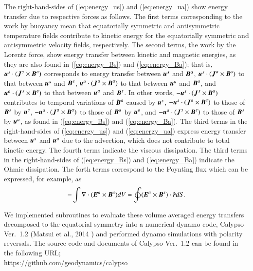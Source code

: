 %
The right-hand-sides of (\ref{eq:energy_us}) and (\ref{eq:energy_ua}) show energy transfer due to respective forces as follows.
The first terms corresponding to the work by buoyancy mean that equatorially symmetric and antisymmetric temperature fields contribute to kinetic energy for the equatorially symmetric and antisymmetric velocity fields, respectively.
The second terms, the work by the Lorentz force, show energy transfer between kinetic and magnetic energies, as they are also found in (\ref{eq:energy_Bs}) and (\ref{eq:energy_Ba}); that is, $\mbox{\boldmath$u$}^s \cdot (\mbox{\boldmath$J$}^s \times \mbox{\boldmath$B$}^a)$ corresponds to energy transfer between $\mbox{\boldmath$u$}^s$ and $\mbox{\boldmath$B$}^a$, $\mbox{\boldmath$u$}^s \cdot (\mbox{\boldmath$J$}^a \times \mbox{\boldmath$B$}^s)$ to that between $\mbox{\boldmath$u$}^s$ and $\mbox{\boldmath$B$}^s$, $\mbox{\boldmath$u$}^a \cdot (\mbox{\boldmath$J$}^a \times \mbox{\boldmath$B$}^a)$ to that between $\mbox{\boldmath$u$}^a$ and $\mbox{\boldmath$B$}^a$, and $\mbox{\boldmath$u$}^a \cdot (\mbox{\boldmath$J$}^s \times \mbox{\boldmath$B$}^s)$ to that between $\mbox{\boldmath$u$}^a$ and $\mbox{\boldmath$B$}^s$.
In other words, $-\mbox{\boldmath$u$}^s \cdot (\mbox{\boldmath$J$}^s \times \mbox{\boldmath$B$}^a)$ contributes to temporal variations of $\mbox{\boldmath$B$}^a$ caused by $\mbox{\boldmath$u$}^s$, 
$-\mbox{\boldmath$u$}^s \cdot (\mbox{\boldmath$J$}^a \times \mbox{\boldmath$B$}^s)$ to those of $\mbox{\boldmath$B$}^s$ by %
{\color{red} $\mbox{\boldmath$u$}^s$,}
$-\mbox{\boldmath$u$}^a \cdot (\mbox{\boldmath$J$}^a \times \mbox{\boldmath$B$}^a)$ to those of $\mbox{\boldmath$B$}^a$ by $\mbox{\boldmath$u$}^a$, and 
$-\mbox{\boldmath$u$}^a \cdot (\mbox{\boldmath$J$}^s \times \mbox{\boldmath$B$}^s)$ to those of $\mbox{\boldmath$B$}^s$ by $\mbox{\boldmath$u$}^a$, as found in (\ref{eq:energy_Bs}) and (\ref{eq:energy_Ba}).
The third terms in the right-hand-sides of (\ref{eq:energy_us}) and (\ref{eq:energy_ua}) express energy transfer between $\mbox{\boldmath$u$}^s$ and $\mbox{\boldmath$u$}^a$ due to the advection, which does not contribute to total kinetic energy.
The fourth terms indicate the viscous dissipation. 
The third terms in the right-hand-sides of (\ref{eq:energy_Bs}) and (\ref{eq:energy_Ba}) indicate the Ohmic dissipation.
The forth terms correspond to the Poynting flux which can be expressed, for example, as
%
\begin{equation}
-\int \nabla \cdot
  ( \mbox{\boldmath$E$}^a \times \mbox{\boldmath$B$}^s ) d V =
 \oint (\mbox{\boldmath$E$}^a \times \mbox{\boldmath$B$}^s )
   \cdot \hat{\mbox{\boldmath$r$}} d S .
\label{eq:Poynting}
\end{equation}
%

We implemented subroutines to evaluate these volume averaged energy transfers decomposed to the equatorial symmetry into a numerical dynamo code, Calypso Ver.~1.2 (Matsui et al., 2014 \cite{Matsui:2014}) and performed dynamo simulations with polarity reversals.
%
The source code and documents of Calypso Ver.~1.2 can be found in the following URL;\\
https://github.com/geodynamics/calypso\\
